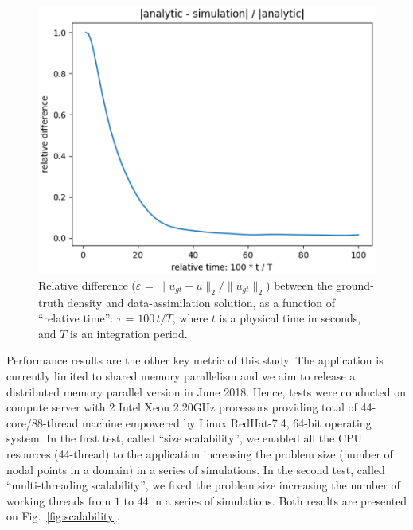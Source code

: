 \documentclass[acmsmall,review,anonymous]{acmart}\settopmatter{printfolios=true,printccs=false,printacmref=false}
\begin{document}
\begin{figure}
\includegraphics[scale=0.5]{images/rel-diff-Nx304-Ny240}
\caption{Relative difference ($\varepsilon$ = $\|u_{gt} - u\|_2 / \|u_{gt}\|_2$) between the ground-truth density and data-assimilation solution, as a function of ``relative time'': $\tau$ = $100\,t / T$, where $t$ is a physical time in seconds, and $T$ is an integration period.}
\label{fig:relerr}
\end{figure}

Performance results are the other key metric of this study. The application is currently limited to shared memory parallelism and we aim to release a distributed memory parallel version in June 2018. Hence, tests were conducted on compute server with 2 Intel Xeon 2.20GHz processors providing total of 44-core/88-thread machine empowered by Linux RedHat-7.4, 64-bit operating system. In the first test, called ``size scalability'', we enabled all the CPU resources (44-thread) to the application increasing the problem size (number of nodal points in a domain) in a series of simulations. In the second test, called ``multi-threading scalability'', we fixed the problem size increasing the number of working threads from $1$ to $44$ in a series of simulations. Both results are presented on Fig.~\ref{fig:scalability}.
\end{document}
